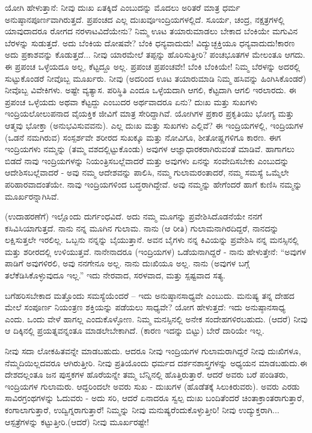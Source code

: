ಯೋಗಿ ಹೇಳುತ್ತಾನೆ: ನೀವು ದುಃಖ ಏತಕ್ಕಿದೆ ಎಂಬುದನ್ನು ಮೊದಲು ಅರಿತರೆ ಮಾತ್ರ ಧರ್ಮ ಅನುಷ್ಠಾನಪೂರ್ಣವಾಗಿರುತ್ತದೆ. ಪ್ರಪಂಚದ ಎಲ್ಲ ದುಃಖವೂ\break ಇಂದ್ರಿಯಗಳಲ್ಲಿದೆ. ಸೂರ್ಯ, ಚಂದ್ರ, ನಕ್ಷತ್ರಗಳಲ್ಲಿ ಯಾವುದಾದರೂ ರೋಗದ ನರಳಾಟವಿದೆಯೇನು? ನಿಮ್ಮ ಊಟ ತಯಾರುಮಾಡಲು ಬೇಕಾದ ಬೆಂಕಿಯೇ ಮಗುವಿನ ಬೆರಳನ್ನು ಸುಡುತ್ತದೆ. ಅದು ಬೆಂಕಿಯ ದೋಷವೇ? ಬೆಂಕಿ ಧನ್ಯವಾದುದು! ವಿದ್ಯುಚ್ಛಕ್ತಿಯೂ ಧನ್ಯವಾದುದು!ಕಾರಣ ಅದು ಪ್ರಕಾಶವನ್ನು ಕೊಡುತ್ತದೆ... ನೀವು ಯಾರಮೇಲೆ ತಪ್ಪನ್ನು ಹೊರಿಸುತ್ತೀರಿ? ಪಂಚಭೂತಗಳ ಮೇಲಂತೂ ಆಗದು. ಈ ಪ್ರಪಂಚ ಒಳ್ಳೆಯದೂ ಅಲ್ಲ, ಕೆಟ್ಟದ್ದೂ ಅಲ್ಲ. ಪ್ರಪಂಚ ಪ್ರಪಂಚವೇ! ಬೆಂಕಿ ಬೆಂಕಿಯೇ! ನಿಮ್ಮ ಬೆರಳನ್ನು ಅದರಲ್ಲಿ ಸುಟ್ಟುಕೊಂಡರೆ ನೀವೊಬ್ಬ ಮೂರ್ಖರು. ನೀವು (ಅದರಿಂದ ಊಟ ತಯಾರುಮಾಡಿ ನಿಮ್ಮ ಹಸಿವನ್ನು ಹಿಂಗಿಸಿಕೊಂಡರೆ) ನೀವೊಬ್ಬ ವಿವೇಕಿಗಳು. ಅಷ್ಟೇ ವ್ಯತ್ಯಾಸ. ಪರಿಸ್ಥಿತಿ ಎಂದೂ ಒಳ್ಳೆಯದಾಗಿ ಆಗಲಿ, ಕೆಟ್ಟದಾಗಿ ಆಗಲಿ ಇರಲಾರದು. ಈ ಪ್ರಪಂಚ ಒಳ್ಳೆಯದು ಅಥವಾ ಕೆಟ್ಟದ್ದು ಎಂಬುದರ ಅರ್ಥವಾದರೂ ಏನು? ದುಃಖ ಮತ್ತು ಸುಖಗಳು ಇಂದ್ರಿಯಲೋಲುಪನಾದ ವೈಯಕ್ತಿಕ ಜೀವಿಗೆ ಮಾತ್ರ ಸೇರಿದ್ದಾಗಿವೆ. ಯೋಗಿಗಳ ಪ್ರಕಾರ ಪ್ರಕೃತಿಯು ಭೋಗ್ಯ ಮತ್ತು ಆತ್ಮವು ಭೋಕ್ತಾ (ಅನುಭವಿಸುವವನು). ಎಲ್ಲ ದುಃಖ ಮತ್ತು ಸುಖಗಳು ಎಲ್ಲಿವೆ? ಈ ಇಂದ್ರಿಯಗಳಲ್ಲಿ, ಇಂದ್ರಿಯಗಳ (ಒಡನೆ ನಮಗಿರುವ) ಸಂಸ್ಪರ್ಶವೇ ಶರೀರದ ಸುಖಕ್ಕೂ ಮತ್ತು ನೋವಿಗೂ, ಶೀತೋಷ್ಣಗಳಿಗೂ ಕಾರಣ. ಈಗ ಇಂದ್ರಿಯಗಳು ನಮ್ಮನ್ನು (ತಮ್ಮ ವಶದಲ್ಲಿಟ್ಟುಕೊಂಡು) ಅವುಗಳ ಆಜ್ಞಾಧಾರಕರಾಗಿರುವಂತೆ ಮಾಡಿವೆ. ಹಾಗಾಗಲು ಬಿಡದೆ ನಾವು ಇಂದ್ರಿಯಗಳನ್ನು ನಿಯಂತ್ರಿಸಬಲ್ಲೆವಾದರೆ ಮತ್ತು ಅವುಗಳು ಏನನ್ನು ಸಂವೇದಿಸಬೇಕು ಎಂಬುದನ್ನು ಆದೇಶಿಸಬಲ್ಲೆವಾದರೆ - ಅವು ನಮ್ಮ ಆದೇಶವನ್ನು ಪಾಲಿಸಿ, ನಮ್ಮ ಗುಲಾಮರಂತಾದರೆ, ನಮ್ಮ ಸಮಸ್ಯೆ ಒಮ್ಮೆಲೇ ಪರಿಹಾರವಾದಂತೆಯೇ. ನಾವು ಇಂದ್ರಿಯಗಳಿಂದ ಬದ್ಧರಾಗಿದ್ದೇವೆ. ಅವು ನಮ್ಮನ್ನು ಹೇಗೆಂದರೆ ಹಾಗೆ ಕುಣಿಸಿ ನಮ್ಮನ್ನು ಮೂರ್ಖರನ್ನಾಗಿಸಿವೆ.

(ಉದಾಹರಣೆಗೆ) ಇಲ್ಲೊಂದು ದುರ್ಗಂಧವಿದೆ. ಅದು ನಮ್ಮ ಮೂಗನ್ನು ಪ್ರವೇಶಿಸಿದೊಡನೆಯೇ ನನಗೆ ಕಸಿವಿಸಿಯಾಗುತ್ತದೆ. ನಾನು ನನ್ನ ಮೂಗಿನ ಗುಲಾಮ. ನಾನು (ಆ ರೀತಿ) ಗುಲಾಮನಾಗಿರದಿದ್ದರೆ, ನಾನದನ್ನು ಲಕ್ಷಿಸುತ್ತಲೇ ಇರಲಿಲ್ಲ. ಒಬ್ಬನು ನನ್ನನ್ನು ಬೈಯುತ್ತಾನೆ. ಅವನ ಬೈಗಳು ನನ್ನ ಕಿವಿಯನ್ನು ಪ್ರವೇಶಿಸಿ ನನ್ನ ಮನಸ್ಸಿನಲ್ಲಿ ಮತ್ತು ಶರೀರದಲ್ಲಿ ಉಳಿಯುತ್ತವೆ. ನಾನೇನಾದರೂ (ಇಂದ್ರಿಯಗಳ) ಒಡೆಯನಾಗಿದ್ದರೆ - ನಾನು ಹೇಳುತ್ತೇನೆ: “ಅವುಗಳ ಪಾಡಿಗೆ ಅವುಗಳಿರಲಿ, ಅವು ನನಗೇನೂ ಅಲ್ಲ. ನಾನು ದುಃಖಿಯೂ ಅಲ್ಲ. ನಾನು (ಅವುಗಳ ಬಗ್ಗೆ ತಲೆಕೆಡಿಸಿಕೊಳ್ಳುವುದೂ ಇಲ್ಲ.” ಇದು ನೇರವಾದ, ಸರಳವಾದ, ಮತ್ತು ಸ್ಪಷ್ಟವಾದ ಸತ್ಯ.

ಬಗೆಹರಿಸಬೇಕಾದ ಮತ್ತೊಂದು ಸಮಸ್ಯೆಯೆಂದರೆ – ಇದು ಅನುಷ್ಠಾನಸಾಧ್ಯವೇ ಎಂಬುದು. ಮನುಷ್ಯ ತನ್ನ ದೇಹದ ಮೇಲೆ ಸಂಪೂರ್ಣ ನಿಯಂತ್ರಣ ಶಕ್ತಿಯನ್ನು ಪಡೆಯಲು ಸಾಧ್ಯವೇ? ಯೋಗ ಹೇಳುತ್ತದೆ: ಇದು ಅನುಷ್ಠಾನಸಾಧ್ಯ ಎಂದು. ಒಂದು ವೇಳೆ ಹಾಗಲ್ಲ ಎಂದುಕೊಳ್ಳೋಣ. ನಿಮ್ಮ ಮನಸ್ಸಿನಲ್ಲಿ ಅನೇಕ ಸಂದೇಹಗಳಿರಬಹುದು. (ಆದರೆ) ನೀವು ಆ ದಿಕ್ಕಿನಲ್ಲಿ ಪ್ರಯತ್ನವನ್ನಂತೂ ಮಾಡಲೇಬೇಕಾಗಿದೆ. (ಕಾರಣ ಇದನ್ನು ಬಿಟ್ಟು) ಬೇರೆ ದಾರಿಯೇ ಇಲ್ಲ.

ನೀವು ಸದಾ ಲೋಕಹಿತವನ್ನೇ ಮಾಡಬಹುದು. ಆದರೂ ನೀವು ಇಂದ್ರಿಯಗಳ ಗುಲಾಮರಾಗಿದ್ದರೆ ನೀವು ದುಃಖಿಗಳೂ, ನೆಮ್ಮದಿಯಿಲ್ಲದವರೂ ಆಗಿರುತ್ತೀರಿ. ನೀವು ಪ್ರತಿಯೊಂದು ಧರ್ಮದ ದರ್ಶನಶಾಸ್ತ್ರಗಳನ್ನು ಅಧ್ಯಯನ ಮಾಡಬಹುದು.\break ಈ ದೇಶದಲ್ಲಂತೂ ಜನ ಪುಸ್ತಕಗಳ ಹೊರೆಯನ್ನೇ ತಮ್ಮ ಬೆನ್ನಿನಲ್ಲಿ ಹೊತ್ತಿರುತ್ತಾರೆ. ಆದರೆ ಅವರು ಬರೆ ಪಂಡಿತರು, ಇಂದ್ರಿಯಗಳ ಗುಲಾಮರು. ಆದ್ದರಿಂದಲೇ﻿ ಅವರು ಸುಖ - ದುಃಖಗಳ (ಹೊಡೆತಕ್ಕೆ ಸಿಲುಕಿರುವರು). ಅವರು ಎರಡು ಸಾವಿರ\break ಗ್ರಂಥಗಳನ್ನು ಓದುವರು - ಅದು ಸರಿ, ಆದರೆ ಏನಾದರೂ ಸ್ವಲ್ಪ ದುಃಖ ಬಂದಿತೆಂದರೆ ಚಿಂತಾಕ್ರಾಂತರಾಗುತ್ತಾರೆ, ಕಂಗಾಲಾಗುತ್ತಾರೆ, ಉದ್ವಿಗ್ನರಾಗುತ್ತಾರೆ! ನಿಮ್ಮನ್ನು ನೀವು ಮನುಷ್ಯರೆಂದುಕೊಳ್ಳುತ್ತೀರಿ! ನೀವು ಉದ್ಯುಕ್ತರಾಗಿ... ಆಸ್ಪತ್ರೆಗಳನ್ನು ಕಟ್ಟುತ್ತೀರಿ.\break (ಆದರೆ) ನೀವು ಮೂರ್ಖರಷ್ಟೇ!

